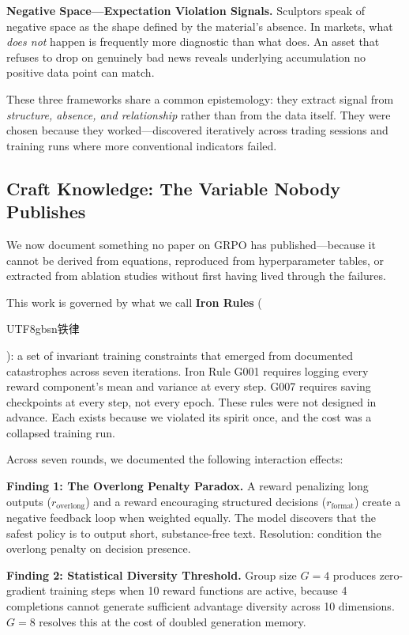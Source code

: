\documentclass[11pt,a4paper]{article}
\begin{document}
\textbf{Negative Space---Expectation Violation Signals.} Sculptors speak of negative space as the shape defined by the material's absence. In markets, what \textit{does not} happen is frequently more diagnostic than what does. An asset that refuses to drop on genuinely bad news reveals underlying accumulation no positive data point can match.

These three frameworks share a common epistemology: they extract signal from \textit{structure, absence, and relationship} rather than from the data itself. They were chosen because they worked---discovered iteratively across trading sessions and training runs where more conventional indicators failed.

\subsection{Craft Knowledge: The Variable Nobody Publishes}

We now document something no paper on GRPO has published---because it cannot be derived from equations, reproduced from hyperparameter tables, or extracted from ablation studies without first having lived through the failures.

This work is governed by what we call \textbf{Iron Rules} (\begin{CJK}{UTF8}{gbsn}铁律\end{CJK}): a set of invariant training constraints that emerged from documented catastrophes across seven iterations. Iron Rule G001 requires logging every reward component's mean and variance at every step. G007 requires saving checkpoints at every step, not every epoch. These rules were not designed in advance. Each exists because we violated its spirit once, and the cost was a collapsed training run.

Across seven rounds, we documented the following interaction effects:

\textbf{Finding 1: The Overlong Penalty Paradox.} A reward penalizing long outputs ($r_{\text{overlong}}$) and a reward encouraging structured decisions ($r_{\text{format}}$) create a negative feedback loop when weighted equally. The model discovers that the safest policy is to output short, substance-free text. Resolution: condition the overlong penalty on decision presence.

\textbf{Finding 2: Statistical Diversity Threshold.} Group size $G=4$ produces zero-gradient training steps when 10 reward functions are active, because 4 completions cannot generate sufficient advantage diversity across 10 dimensions. $G=8$ resolves this at the cost of doubled generation memory.
\end{document}
